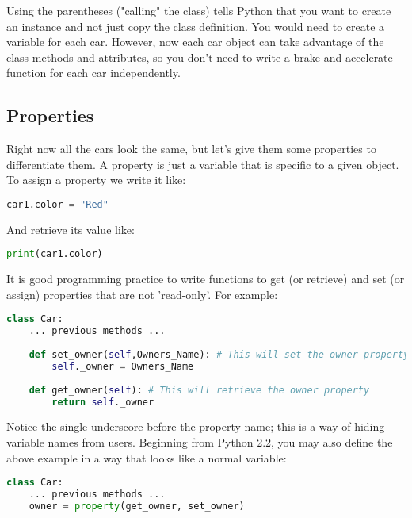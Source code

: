 Using the parentheses ("calling" the class) tells Python that you want to create
an instance and not just copy the class definition. You would need to create a
variable for each car. However, now each car object can take advantage of the
class methods and attributes, so you don't need to write a brake and accelerate
function for each car independently.

\subsection{Properties}
Right now all the cars look the same, but let's give them some properties to
differentiate them.  A property is just a variable that is specific to a given
object. To assign a property we write it like:
\lstset{basicstyle=\scriptsize, numbers=left, captionpos=b, tabsize=4}
\begin{lstlisting}[caption=Property Example Set,language={Python},
xleftmargin=15pt, label=lst:propertyexampleset]
car1.color = "Red"
\end{lstlisting}

And retrieve its value like:
\lstset{basicstyle=\scriptsize, numbers=left, captionpos=b, tabsize=4}
\begin{lstlisting}[caption=Property Example Read,language={Python},
xleftmargin=15pt, label=lst:propertyexampleread]
print(car1.color)
\end{lstlisting}

It is good programming practice to write functions to get (or retrieve) and set
(or assign) properties that are not 'read-only'. For example:
\lstset{basicstyle=\scriptsize, numbers=left, captionpos=b, tabsize=4}
\begin{lstlisting}[caption=Getter Setter,language={Python},
xleftmargin=15pt, label=lst:gettersetter]
class Car:
    ... previous methods ...
 
    def set_owner(self,Owners_Name): # This will set the owner property
        self._owner = Owners_Name
 
    def get_owner(self): # This will retrieve the owner property
        return self._owner
\end{lstlisting}

Notice the single underscore before the property name; this is a way of hiding
variable names from users.  Beginning from Python 2.2, you may also define the
above example in a way that looks like a normal variable:
\lstset{basicstyle=\scriptsize, numbers=left, captionpos=b, tabsize=4}
\begin{lstlisting}[caption=Variable hiding,language={Python},
xleftmargin=15pt, label=lst:variablehiding]
class Car:
    ... previous methods ...
    owner = property(get_owner, set_owner)
\end{lstlisting}

